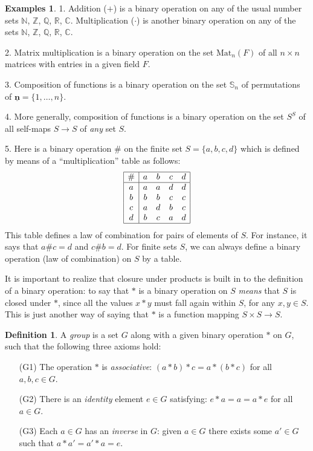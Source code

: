\documentclass[11pt]{article}
\theoremstyle{definition}
\newtheorem{defn}[thm]{Definition}
\newtheorem{examples}[thm]{Examples}
\newcommand{\R}{\mathbb{R}} %
\newcommand{\C}{\mathbb{C}} %
\newcommand{\Z}{\mathbb{Z}} %
\newcommand{\Q}{\mathbb{Q}} %
\newcommand{\N}{\mathbb{N}} %
\newcommand{\Sym}{\mathbb{S}}
\begin{document}
\begin{examples}
1. Addition ($+$) is a binary operation on any of the usual number
sets $\N$, $\Z$, $\Q$, $\R$, $\C$. Multiplication ($\cdot$) is another
binary operation on any of the sets $\N$, $\Z$, $\Q$, $\R$, $\C$.

2. Matrix multiplication is a binary operation on the set
$\text{Mat}_n(F)$ of all $n \times n$ matrices with entries in a given
field $F$.

3. Composition of functions is a binary operation on the set $\Sym_n$
of permutations of $\underline{\mathbf{n}} = \{1, \dots, n\}$.


4. More generally, composition of functions is a binary operation on
the set $S^S$ of all self-maps $S \to S$ of \emph{any} set $S$.

5. Here is a binary operation $\#$ on the finite set $S=\{a,b,c,d\}$
which is defined by means of a ``multiplication'' table as follows:
$$
\begin{array}{|c|cccc|}\hline
\#& a&b&c&d\\ \hline
a & a&a&d&d\\
b & b&b&c&c\\
c & a&d&b&c\\
d & b&c&a&d\\
\hline
\end{array}
$$ This table defines a law of combination for pairs of elements of
$S$. For instance, it says that $a\#c = d$ and $c\#b = d$. For finite
sets $S$, we can always define a binary operation (law of combination)
on $S$ by a table.
\end{examples}



It is important to realize that closure under products is built in to
the definition of a binary operation: to say that $*$ is a binary
operation on $S$ \emph{means} that $S$ is closed under $*$, since all the
values $x*y$ must fall again within $S$, for any $x,y \in S$. This is
just another way of saying that $*$ is a function mapping $S \times S
\to S$.



\begin{defn}
\label{def:group}
A {\em group} is a set $G$ along with a given binary operation $*$
on $G$, such that the following three axioms hold:
\begin{enumerate}
\item[(G1)] The operation $*$ is {\em associative}: $(a*b)*c =
  a*(b*c)$ for all $a,b,c \in G$.

\item[(G2)] There is an {\em identity} element $e \in G$ satisfying:
  $e*a = a = a*e$ for all $a\in G$.

\item[(G3)] Each $a \in G$ has an {\em inverse} in $G$: given $a \in
  G$ there exists some $a' \in G$ such that $a*a' = a'*a = e$.
\end{enumerate}
\end{defn}
\end{document}
